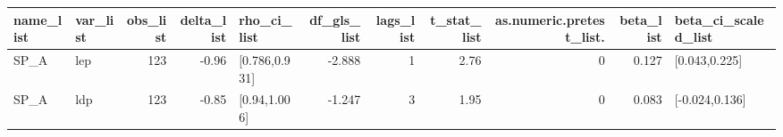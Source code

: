 \begin{table}[ht]
\centering
\begin{tabular}{llrrlrrrrrl}
  \hline
name\_list & var\_list & obs\_list & delta\_list & rho\_ci\_list & df\_gls\_list & lags\_list & t\_stat\_list & as.numeric.pretest\_list. & beta\_list & beta\_ci\_scaled\_list \\ 
  \hline
SP\_A & lep & 123 & -0.96 & [0.786,0.931] & -2.888 & 1 & 2.76 & 0 & 0.127 & [0.043,0.225] \\ 
  SP\_A & ldp & 123 & -0.85 & [0.94,1.006] & -1.247 & 3 & 1.95 & 0 & 0.083 & [-0.024,0.136] \\ 
   \hline
\end{tabular}
\end{table}
